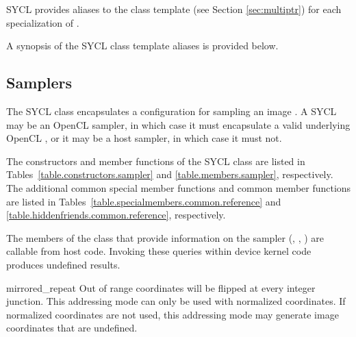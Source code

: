 SYCL provides aliases to the  class template (see Section
\ref{sec:multiptr}) for each specialization of .

A synopsis of the SYCL  class template 
aliases is provided below.


\subsection{Samplers}
\label{subsec:samplers}

The SYCL  class encapsulates a configuration for sampling an image . A SYCL  may be an OpenCL sampler, in which case it must encapsulate a valid underlying OpenCL , or it may be a host sampler, in which case it must not.

The constructors and member functions of the SYCL  class are listed in Tables~\ref{table.constructors.sampler} and \ref{table.members.sampler}, respectively. The additional common special member functions and common member functions are listed in Tables~\ref{table.specialmembers.common.reference} and \ref{table.hiddenfriends.common.reference}, respectively.

The members of the  class that provide information on the sampler (, , ) are callable from host code.  Invoking these queries within device kernel code produces undefined results.



  \addRow
  {mirrored_repeat}
  {
    Out of range coordinates will be flipped at every integer junction. This addressing mode
    can only be used with normalized coordinates. If normalized coordinates are not used, this
    addressing mode may generate image coordinates that are undefined.
  }

